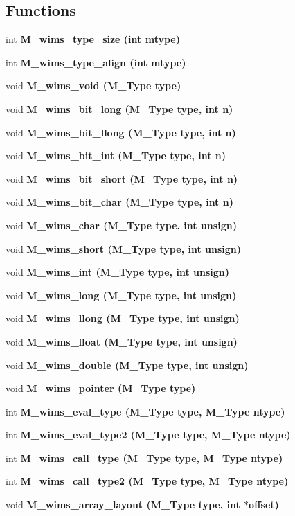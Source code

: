 \subsection*{Functions}
\begin{CompactItemize}
\item 
int \bf{M\_\-wims\_\-type\_\-size} (int mtype)
\item 
int \bf{M\_\-wims\_\-type\_\-align} (int mtype)
\item 
void \bf{M\_\-wims\_\-void} (\bf{M\_\-Type} type)
\item 
void \bf{M\_\-wims\_\-bit\_\-long} (\bf{M\_\-Type} type, int n)
\item 
void \bf{M\_\-wims\_\-bit\_\-llong} (\bf{M\_\-Type} type, int n)
\item 
void \bf{M\_\-wims\_\-bit\_\-int} (\bf{M\_\-Type} type, int n)
\item 
void \bf{M\_\-wims\_\-bit\_\-short} (\bf{M\_\-Type} type, int n)
\item 
void \bf{M\_\-wims\_\-bit\_\-char} (\bf{M\_\-Type} type, int n)
\item 
void \bf{M\_\-wims\_\-char} (\bf{M\_\-Type} type, int unsign)
\item 
void \bf{M\_\-wims\_\-short} (\bf{M\_\-Type} type, int unsign)
\item 
void \bf{M\_\-wims\_\-int} (\bf{M\_\-Type} type, int unsign)
\item 
void \bf{M\_\-wims\_\-long} (\bf{M\_\-Type} type, int unsign)
\item 
void \bf{M\_\-wims\_\-llong} (\bf{M\_\-Type} type, int unsign)
\item 
void \bf{M\_\-wims\_\-float} (\bf{M\_\-Type} type, int unsign)
\item 
void \bf{M\_\-wims\_\-double} (\bf{M\_\-Type} type, int unsign)
\item 
void \bf{M\_\-wims\_\-pointer} (\bf{M\_\-Type} type)
\item 
int \bf{M\_\-wims\_\-eval\_\-type} (\bf{M\_\-Type} type, \bf{M\_\-Type} ntype)
\item 
int \bf{M\_\-wims\_\-eval\_\-type2} (\bf{M\_\-Type} type, \bf{M\_\-Type} ntype)
\item 
int \bf{M\_\-wims\_\-call\_\-type} (\bf{M\_\-Type} type, \bf{M\_\-Type} ntype)
\item 
int \bf{M\_\-wims\_\-call\_\-type2} (\bf{M\_\-Type} type, \bf{M\_\-Type} ntype)
\item 
void \bf{M\_\-wims\_\-array\_\-layout} (\bf{M\_\-Type} type, int $\ast$offset)
\item 

\end{CompactItemize}
